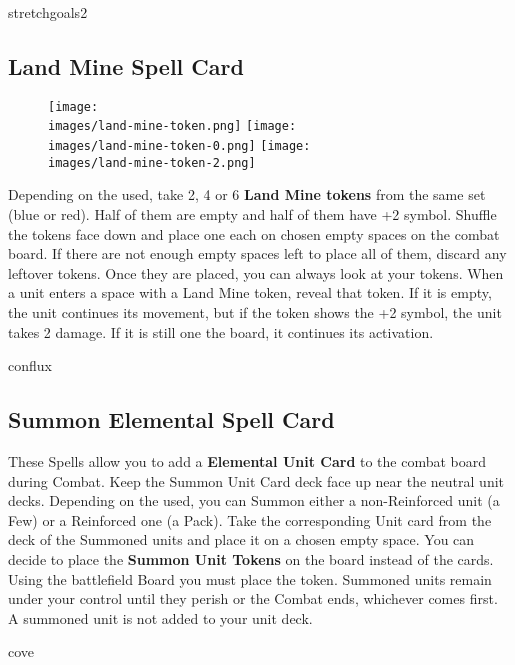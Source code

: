 \begin{multicols*}{2}
\begin{expansion}{stretchgoals2}
	\subsection*{Land Mine Spell Card}
  \setlength\intextsep{0pt}
  \setlength\columnsep{1em}
  \begin{wrapfigure}{r}{0.2\linewidth}
    \texttt{[image: \\images/land-mine-token.png]}\vspace*{1em}
    \texttt{[image: \\images/land-mine-token-0.png]}\vspace*{1em}
		\texttt{[image: \\images/land-mine-token-2.png]}
  \end{wrapfigure}
	Depending on the  used, take 2, 4 or 6 \textbf{Land Mine tokens} from the same set  (blue or red).
  Half of them are empty and half of them have +2  symbol.
  Shuffle the tokens face down and place one each on chosen empty spaces on the combat board.
  If there are not enough empty spaces left to place all of them, discard any leftover tokens.
  Once they are placed, you can always look at your tokens.
  When a unit enters a space with a Land Mine token, reveal that token.
  If it is empty, the unit continues its movement, but if the token shows the +2  symbol, the unit takes 2 damage.
  If it is still one the board, it continues its activation.
\end{expansion}
\vspace*{1em}
\begin{expansion}{conflux}
	\subsection*{Summon Elemental Spell Card}
	These Spells allow you to add a \textbf{Elemental Unit Card} to the combat board during Combat. Keep the Summon Unit Card deck face up near the neutral unit decks. Depending on the  used, you can Summon either a non-Reinforced unit (a Few) or a Reinforced one (a Pack). Take the corresponding Unit card from the deck of the Summoned units and place it on a chosen empty space. You can decide to place the \textbf{Summon Unit Tokens} on the board instead of the cards. Using the battlefield Board you must place the token. Summoned units remain under your control until they perish or the Combat ends, whichever comes first. A summoned unit is not added to your unit deck.
\end{expansion}
\vspace*{1em}
\begin{expansion}{cove}

\end{expansion}
\end{multicols*}
